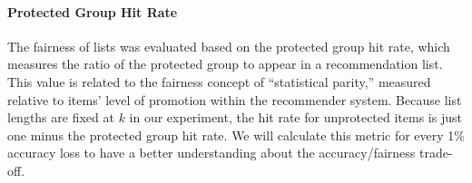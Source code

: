         \vspace{0.25cm}
        \noindent \paragraph{Protected Group Hit Rate}
        \vspace{0.25cm}
        
            The fairness of lists was evaluated based on the protected group hit rate, which measures the ratio of the protected group to appear in a recommendation list. This value is related to the fairness concept of ``statistical parity,'' measured relative to items' level of promotion within the recommender system. Because list lengths are fixed at $k$ in our experiment, the hit rate for unprotected items is just one minus the protected group hit rate. We will calculate this metric for every 1\% accuracy loss to have a better understanding about the accuracy/fairness trade-off.
            
        
        
        
        
    
        
